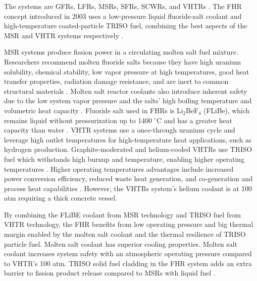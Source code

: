 The systems are \glspl{GFR}, \glspl{LFR}, \glspl{MSR}, \glspl{SFR}, \glspl{SCWR}, 
and \glspl{VHTR} \cite{gif_technology_2002}. 
The \acrfull{FHR} concept introduced in 2003 uses a low-pressure liquid fluoride-salt 
coolant and high-temperature coated-particle \gls{TRISO} fuel, combining 
the best aspects of the \gls{MSR} and \gls{VHTR} systems respectively
\cite{forsberg_molten-salt-cooled_2003,facilitators_fluoride-salt-cooled_2013}.

\gls{MSR} systems produce fission power in a circulating molten salt fuel 
mixture. 
Researchers recommend molten fluoride salts because they have high uranium 
solubility, chemical stability, low vapor pressure at high temperatures, 
good heat transfer properties, radiation damage resistance, and are inert 
to common structural materials \cite{rosenthal_molten-salt_1970}. 
Molten salt reactor coolants also introduce inherent safety due to the 
low system vapor pressure and the salts' high boiling temperature and 
volumetric heat capacity \cite{ho_molten_2013}.
Fluoride salt used in \glspl{FHR} is Li$_2$BeF$_4$ (FLiBe), 
which remains liquid without pressurization up to 1400 $^{\circ}$C and has a greater 
heat capacity than water \cite{ho_molten_2013,forsberg_fluoride-salt-cooled_2012}.
\gls{VHTR} systems use a once-through uranium cycle and leverage 
high outlet temperatures for high-temperature heat applications, such as 
hydrogen production. 
Graphite-moderated and helium-cooled \glspl{VHTR} use \gls{TRISO} fuel
which withstands high burnup and temperature, enabling higher operating 
temperatures \cite{gif_technology_2002}.  
Higher operating temperatures advantages include increased power 
conversion efficiency, reduced waste heat generation, and co-generation and 
process heat capabilities \cite{scarlat_design_2014}.
However, the \glspl{VHTR} system's helium coolant is at 100 atm requiring a 
thick concrete vessel. 

By combining the FLiBE coolant from \gls{MSR} technology and 
\gls{TRISO} fuel from \gls{VHTR} technology, the \gls{FHR} benefits from 
low operating pressure and big thermal margin enabled by the molten 
salt coolant and the thermal resilience of \gls{TRISO} particle fuel. 
Molten salt coolant has superior cooling properties. Molten salt coolant 
increases system safety with an atmospheric operating pressure compared to 
\gls{VHTR}'s 100 atm. 
\gls{TRISO} solid fuel cladding in the \gls{FHR} system adds an extra barrier 
to fission product release compared to \glspl{MSR} with liquid fuel 
\cite{ho_molten_2013}.

